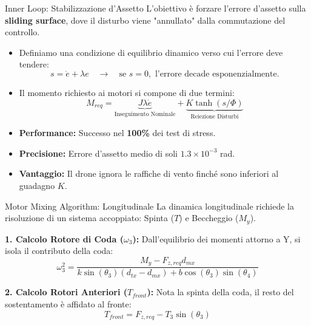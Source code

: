 \documentclass[aspectratio=169]{beamer} %
\begin{document}
\begin{frame}{Inner Loop: Stabilizzazione d'Assetto}
    L'obiettivo è forzare l'errore d'assetto sulla \textbf{sliding surface}, dove il disturbo viene "annullato" dalla commutazione del controllo.
    \begin{itemize}
    \item Definiamo una condizione di equilibrio dinamico verso cui l'errore deve tendere:
    \begin{equation*}
        s = \dot{e} + \lambda e \quad \longrightarrow \quad \text{se } s=0, \text{ l'errore decade esponenzialmente.}
    \end{equation*}

    \item Il momento richiesto ai motori si compone di due termini:
    \begin{equation*}
        M_{req} = \underbrace{J \lambda \dot{e}}_{\text{Inseguimento Nominale}} + \underbrace{K \tanh(s / \Phi)}_{\text{Reiezione Disturbi}}
    \end{equation*}
    \end{itemize}

    \begin{itemize}
        \item \textbf{Performance:} Successo nel \textbf{100\%} dei test di stress.
        \item \textbf{Precisione:} Errore d'assetto medio di soli $1.3 \times 10^{-3}$ rad.
        \item \textbf{Vantaggio:} Il drone ignora le raffiche di vento finché sono inferiori al guadagno $K$.
    \end{itemize}
\end{frame}

\begin{frame}{Motor Mixing Algorithm: Longitudinale}
    La dinamica longitudinale richiede la risoluzione di un sistema accoppiato: Spinta ($T$) e Beccheggio ($M_y$).
    
    \vspace{0.3cm}
    \textbf{1. Calcolo Rotore di Coda ($\omega_3$):}
    Dall'equilibrio dei momenti attorno a Y, si isola il contributo della coda:
    \begin{equation}
        \omega_3^2 = \frac{M_y - F_{z,req} d_{mx}}{k \sin(\theta_3) (d_{tx} - d_{mx}) + b \cos(\theta_3) \sin(\theta_4)}
    \end{equation}
    
    \vspace{0.3cm}
    \textbf{2. Calcolo Rotori Anteriori ($T_{front}$):}
    Nota la spinta della coda, il resto del sostentamento è affidato al fronte:
    \begin{equation}
        T_{front} = F_{z,req} - T_3 \sin(\theta_3)
    \end{equation}
\end{frame}
\end{document}
